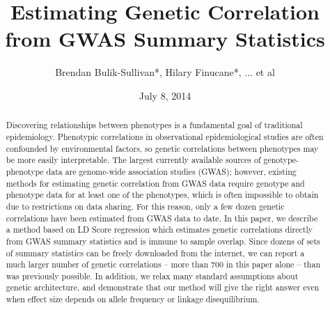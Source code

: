 \documentclass[11pt]{article}
\title{Estimating Genetic Correlation from GWAS Summary Statistics}
\author{Brendan Bulik-Sullivan*, Hilary Finucane*, ... et al}
\date{July 8, 2014}
\begin{document}
\maketitle




% 
%

\begin{abstract}\label{abstract}

Discovering relationships between phenotypes is a fundamental goal of traditional epidemiology.
Phenotypic correlations in observational epidemiological studies are often confounded by environmental factors,
so genetic correlations between phenotypes may be more easily interpretable.
The largest currently available sources of genotype-phenotype data are genome-wide association studies (GWAS); 
however, existing methods for estimating genetic correlation from GWAS data require
genotype and phenotype data for at least one of the phenotypes, 
which is often impossible to obtain due to restrictions on data sharing.
For this reason, only a few dozen genetic correlations have been estimated from GWAS data to date.
In this paper, we describe a method based on LD Score regression
which estimates genetic correlations directly from GWAS summary statistics
and is immune to sample overlap. 
Since dozens of sets of summary statistics can be freely downloaded from the internet,
we can report a much larger number of  genetic correlations 
 -- more than 700 in this paper alone -- than was previously possible.
In addition, we relax many standard assumptions about genetic architecture, 
and demonstrate that our method will give the right answer
even when effect size depends on allele frequency or linkage disequilibrium.

\end{abstract}
\end{document}
